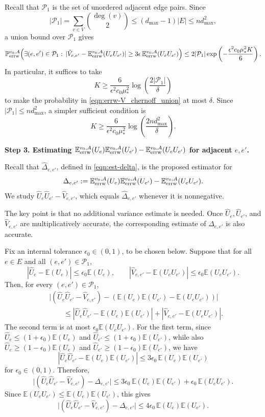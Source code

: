 \documentclass[a4paper, 11pt]{article}
\renewcommand{\P}{\mathbb{P}}
\newcommand{\E}{\mathbb{E}}
\newcommand{\Eerrw}{\E_{\textnormal{errw}}}
\newcommand{\Perrw}{\P_{\textnormal{errw}}}
\begin{document}
Recall that
\(
\mathcal P_1
\)
is the set of unordered adjacent edge pairs. Since
\[
|\mathcal P_1|
=
\sum_{v\in V}\binom{\deg(v)}2
\le
(d_{\max}-1)|E|
\le
nd_{\max}^2,
\]
a union bound over \(\mathcal P_1\) gives
\begin{equation}
\label{eqn:errw-V_chernoff_union}
\Perrw^{v_0,A}\Big(
\exists (e,e')\in\mathcal P_1:\,
|\hat V_{e,e'}-\Eerrw^{v_0,A}(U_eU_{e'})|
\ge
3\epsilon\,\Eerrw^{v_0,A}(U_eU_{e'})
\Big)
\le
2|\mathcal P_1|
\exp\left(
-\frac{\epsilon^2c_0\mu_*^2K}{6}
\right).
\end{equation}
In particular, it suffices to take
\[
K\ge
\frac{6}{\epsilon^2c_0\mu_*^2}
\log\left(\frac{2|\mathcal P_1|}{\delta}\right)
\]
to make the probability in \cref{eqn:errw-V_chernoff_union} at most \(\delta\). Since
\(|\mathcal P_1|\le nd_{\max}^2\), a simpler sufficient condition is
\[
K\ge
\frac{6}{\epsilon^2c_0\mu_*^2}
\log\left(\frac{2nd_{\max}^2}{\delta}\right).
\]

\textbf{Step 3. Estimating 
$\Eerrw^{v_0,A}(U_e)\Eerrw^{v_0,A}(U_{e'})
-\Eerrw^{v_0,A}(U_eU_{e'})$ for adjacent $e,e'$.}

Recall that $\hat\Delta_{e,e'}$, defined in \cref{eqn:est-delta}, is the proposed estimator for
\[
\Delta_{e,e'}
:=
\Eerrw^{v_0,A}(U_e)\Eerrw^{v_0,A}(U_{e'})
-
\Eerrw^{v_0,A}(U_eU_{e'}).
\]
We study $\hat U_e\hat U_{e'}-\hat V_{e,e'}$, which equals $\hat\Delta_{e,e'}$ whenever it is nonnegative.

The key point is that no additional variance estimate is needed. Once $\hat U_e,\hat U_{e'}$, and $\hat V_{e,e'}$ are multiplicatively accurate, the corresponding estimate of $\Delta_{e,e'}$ is also accurate.

Fix an internal tolerance $\epsilon_0\in(0,1)$, to be chosen below. Suppose that for all $e\in E$ and all $(e,e')\in\mathcal P_1$,
\[
|\hat U_e-\E(U_e)|\le \epsilon_0\E(U_e),
\qquad
|\hat V_{e,e'}-\E(U_eU_{e'})|\le \epsilon_0\E(U_eU_{e'}).
\]
Then, for every $(e,e')\in\mathcal P_1$,
\begin{align*}
&\big|
(\hat U_e\hat U_{e'}-\hat V_{e,e'})
-
(\E(U_e)\E(U_{e'})-\E(U_eU_{e'}))
\big| \\
&\qquad\le
|\hat U_e\hat U_{e'}-\E(U_e)\E(U_{e'})|
+
|\hat V_{e,e'}-\E(U_eU_{e'})|.
\end{align*}
The second term is at most $\epsilon_0\E(U_eU_{e'})$. For the first term, since
$\hat U_e\le (1+\epsilon_0)\E(U_e)$ and
$\hat U_{e'}\le (1+\epsilon_0)\E(U_{e'})$, while also
$\hat U_e\ge (1-\epsilon_0)\E(U_e)$ and
$\hat U_{e'}\ge (1-\epsilon_0)\E(U_{e'})$, we have
\[
|\hat U_e\hat U_{e'}-\E(U_e)\E(U_{e'})|
\le
3\epsilon_0\,\E(U_e)\E(U_{e'})
\]
for $\epsilon_0\in(0,1)$. Therefore,
\begin{equation}
\label{eqn:errw-delta-det-bound}
\big|
(\hat U_e\hat U_{e'}-\hat V_{e,e'})
-\Delta_{e,e'}
\big|
\le
3\epsilon_0\,\E(U_e)\E(U_{e'})
+
\epsilon_0\,\E(U_eU_{e'}).
\end{equation}
Since $\E(U_eU_{e'})\le \E(U_e)\E(U_{e'})$, this gives
\[
\big|
(\hat U_e\hat U_{e'}-\hat V_{e,e'})
-\Delta_{e,e'}
\big|
\le
4\epsilon_0\,\E(U_e)\E(U_{e'}).
\]
\end{document}

